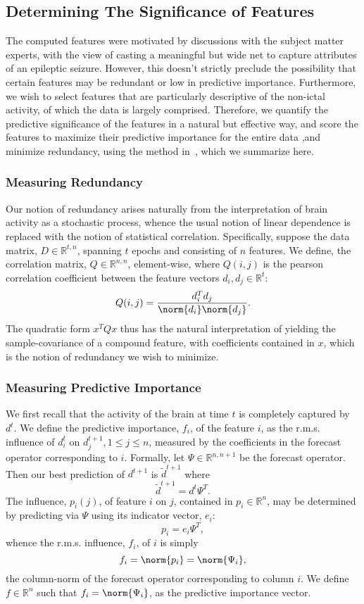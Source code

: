 \documentclass{article} %
\theoremstyle{definition}
\theoremstyle{remark}
\newcommand{\rl}{\mathbb{R}}
\newcommand{\rls}[1]{\mathbb{R}^{#1}}
\begin{document}
\subsection{Determining The Significance of Features}
The computed features were motivated by discussions with the subject matter experts, with the view of casting a meaningful but wide net to capture  attributes of an epileptic seizure. However, this doesn't strictly preclude the possibility that certain features may be redundant or low in predictive importance. Furthermore, we wish to select features that are particularly descriptive of the non-ictal activity, of which the data is largely comprised. Therefore, we quantify the predictive significance of the features in a natural but effective way, and score the features to maximize their predictive importance for the entire data ,and minimize redundancy, using the method in~\cite{quadprog_featsel}, which we summarize here.

\subsubsection{Measuring Redundancy}
Our notion of redundancy arises naturally from the interpretation of brain activity as a stochastic process, whence the usual notion of linear dependence is replaced with the notion of statistical correlation. Specifically, suppose the data matrix, $D \in \rls{t, n}$, spanning $t$ epochs and consisting of $n$ features. We define, the correlation matrix, $Q \in \rls{n, n}$, element-wise, where $Q(i, j)$ is the pearson correlation coefficient between the feature vectors $d_i, d_j \in \rl^{t}$:
\[ Q(i, j) = \frac{d_i ^T d_j}{\norm{d_i}\norm{d_j}}.  \]
The quadratic form $x^T Q x$ thus has the natural interpretation of yielding the sample-covariance of a compound feature, with coefficients contained in $x$, which is the notion of redundancy we wish to minimize.

\subsubsection{Measuring Predictive Importance}
We first recall that the activity of the brain at time $t$ is completely captured by $d^t$. We define the predictive importance, $f_i$, of the feature $i$, as the r.m.s. influence of $d_i ^t$ on $d_j ^{t+1}, 1 \leq j \leq n$, measured by the coefficients in the forecast operator corresponding to $i$. Formally, let $\Psi \in \rls{n, n+1}$ be the forecast operator. Then our best prediction of $d^{t+1}$ is $\tilde{d}^{t+1}$ where
\[ \tilde d^{t+1} = d^t \Psi ^T. \]
The influence, $p_i (j)$, of feature $i$ on $j$, contained in $p_i \in \rl^n$, may be determined by predicting via $\Psi$ using its indicator vector, $e_i$:
\[ p_i = e_i \Psi^T,  \]
whence the r.m.s. influence, $f_i$, of $i$ is simply 
\[ f_i = \norm{p_i} = \norm{\Psi_i}, \]
the column-norm of the forecast operator corresponding to column $i$. We define $f \in \rl^n$ such that $f_i = \norm{\Psi_i}$, as the predictive importance vector. 
\end{document}
